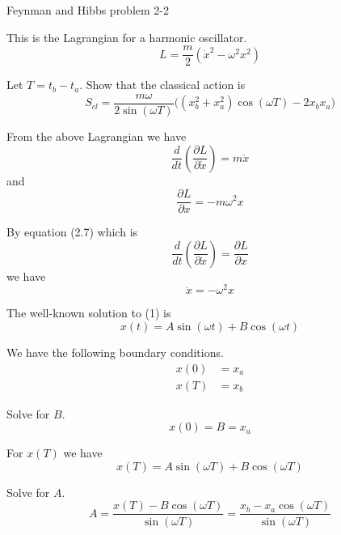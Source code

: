 \documentclass[12pt]{article}
\begin{document}
Feynman and Hibbs problem 2-2

\bigskip
This is the Lagrangian for a harmonic oscillator.
\begin{equation*}
L=\frac{m}{2}(\dot{x}^2-\omega^2 x^2)
\end{equation*}

\noindent
Let $T=t_b-t_a$.
Show that the classical action is
\begin{equation*}
S_{cl}=\frac{m\omega}{2\sin(\omega T)}
\bigg((x_b^2+x_a^2)\cos(\omega T)-2x_b x_a\bigg)
\end{equation*}

From the above Lagrangian we have
\begin{equation*}
\frac{d}{dt}\left(\frac{\partial L}{\partial\dot x}\right)=m\ddot x
\end{equation*}
and
\begin{equation*}
\frac{\partial L}{\partial x}=-m\omega^2x
\end{equation*}

By equation (2.7) which is
\begin{equation*}
\frac{d}{dt}\left(\frac{\partial L}{\partial\dot x}\right)=\frac{\partial L}{\partial x}
\end{equation*}
we have
\begin{equation*}
\ddot x=-\omega^2x
\tag{1}
\end{equation*}

The well-known solution to (1) is
\begin{equation*}
x(t)=A\sin(\omega t)+B\cos(\omega t)
\end{equation*}

We have the following boundary conditions.
\begin{align*}
x(0)&=x_a
\\[1ex]
x(T)&=x_b
\end{align*}

Solve for $B$.
\begin{equation*}
x(0)=B=x_a
\end{equation*}

For $x(T)$ we have
\begin{equation*}
x(T)=A\sin(\omega T)+B\cos(\omega T)
\end{equation*}

Solve for $A$.
\begin{equation*}
A=\frac{x(T)-B\cos(\omega T)}{\sin(\omega T)}=
\frac{x_b-x_a\cos(\omega T)}{\sin(\omega T)}
\end{equation*}
\end{document}
